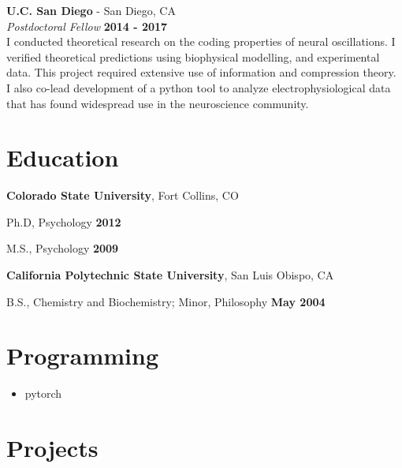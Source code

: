 \documentclass[margin,line]{res}
\newenvironment{list1}{
    \begin{list}{\ding{113}}{%
        \setlength{\itemsep}{0in}
        \setlength{\parsep}{0in} \setlength{\parskip}{0in}
        \setlength{\topsep}{0in} \setlength{\partopsep}{0in}
        \setlength{\leftmargin}{0.17in}}}{
    \end{list}}
\begin{document}
\begin{resume}
\vspace{-.1cm}
{\bf U.C. San Diego} - San Diego, CA\\
{\em Postdoctoral Fellow} \hfill {\bf 2014 - 2017}\\
I conducted theoretical research on the coding properties of neural oscillations. I verified theoretical predictions using biophysical modelling, and experimental data. This project required extensive use of information and compression theory. I also co-lead development of a python tool to analyze electrophysiological data that has found widespread use in the neuroscience community.

\section{\sc Education}
{\bf Colorado State University}, Fort Collins, CO\\
\vspace*{-.15in}
\begin{list1}
    \tightlist
    \item[] Ph.D, Psychology \hfill {\bf 2012}
    \item[] M.S., Psychology \hfill {\bf 2009}
\end{list1}

\vspace*{-.1in}
{\bf California Polytechnic State University}, San Luis Obispo, CA\\
\vspace*{-.15in}
\begin{list1}
    \tightlist
    \item[] B.S., Chemistry and Biochemistry; Minor, Philosophy \hfill {\bf May 2004}
\end{list1}


\section{\sc Programming}
\begin{itemize}
      \tightlist
      \item pytorch
\end{itemize}


\section{\sc Projects}



\end{resume}
\end{document}
